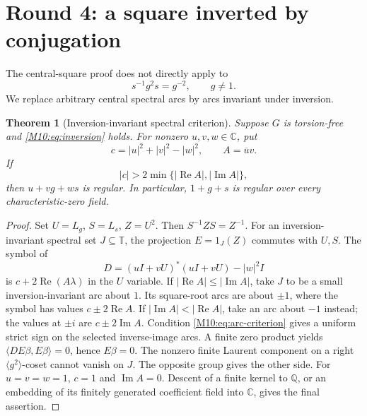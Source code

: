 \documentclass[11pt,a4paper,oneside]{report}
\newtheorem{theorem}{Theorem}[section]
\theoremstyle{definition}
\theoremstyle{remark}
\DeclareMathOperator{\Rea}{Re}
\DeclareMathOperator{\Ima}{Im}
\newcommand{\C}{\mathbb C}
\newcommand{\Q}{\mathbb Q}
\newcommand{\T}{\mathbb T}
\begin{document}
\section{Round 4: a square inverted by conjugation}
The central-square proof does not directly apply to
\begin{equation}\label{M10:eq:inversion}
s^{-1}g^2s=g^{-2},\qquad g\ne1.
\end{equation}
We replace arbitrary central spectral arcs by arcs invariant under
inversion.

\begin{theorem}[Inversion-invariant spectral criterion]\label{M10:thm:inverse}
Suppose $G$ is torsion-free and \eqref{M10:eq:inversion} holds.
For nonzero $u,v,w\in\C$, put
\[
c=|u|^2+|v|^2-|w|^2,\qquad A=\overline u v.
\]
If
\begin{equation}\label{M10:eq:arc-criterion}
|c|>2\min\{|\Rea A|,|\Ima A|\},
\end{equation}
then $u+vg+ws$ is regular. In particular, $1+g+s$ is regular
over every characteristic-zero field.
\end{theorem}
\begin{proof}
Set $U=L_g$, $S=L_s$, $Z=U^2$. Then $S^{-1}ZS=Z^{-1}$.
For an inversion-invariant spectral set $J\subseteq\T$, the
projection $E=1_J(Z)$ commutes with $U,S$. The symbol of
\[
D=(uI+vU)^*(uI+vU)-|w|^2I
\]
is $c+2\Rea(A\lambda)$ in the $U$ variable.
If $|\Rea A|\le|\Ima A|$, take $J$ to be a small
inversion-invariant arc about $1$. Its square-root arcs are about
$\pm1$, where the symbol has values $c\pm2\Rea A$.
If $|\Ima A|<|\Rea A|$, take an arc about $-1$ instead;
the values at $\pm i$ are $c\pm2\Ima A$.
Condition \eqref{M10:eq:arc-criterion} gives a uniform strict sign
on the selected inverse-image arcs. A finite zero product yields
$\langle DE\beta,E\beta\rangle=0$, hence $E\beta=0$.
The nonzero finite Laurent component on a right
$\langle g^2\rangle$-coset cannot vanish on $J$.
The opposite group gives the other side.
For $u=v=w=1$, $c=1$ and $\Ima A=0$. Descent of a finite
kernel to $\Q$, or an embedding of its finitely generated
coefficient field into $\C$, gives the final assertion.
\end{proof}
\end{document}
